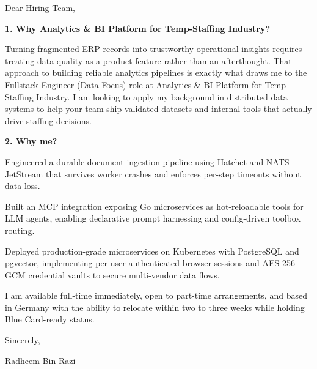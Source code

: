 \documentclass[11pt,a4paper]{coverletter}
\begin{document}

\opening{Dear Hiring Team,}

\vspace{8pt}\noindent\textbf{1. Why Analytics \& BI Platform for Temp-Staffing Industry?}\par\vspace{3pt}

Turning fragmented ERP records into trustworthy operational insights requires treating data quality as a product feature rather than an afterthought. That approach to building reliable analytics pipelines is exactly what draws me to the Fullstack Engineer (Data Focus) role at Analytics \& BI Platform for Temp-Staffing Industry. I am looking to apply my background in distributed data systems to help your team ship validated datasets and internal tools that actually drive staffing decisions.

\vspace{8pt}\noindent\textbf{2. Why me?}\par\vspace{3pt}

\bullets

  \item Engineered a durable document ingestion pipeline using Hatchet and NATS JetStream that survives worker crashes and enforces per-step timeouts without data loss.

  \item Built an MCP integration exposing Go microservices as hot-reloadable tools for LLM agents, enabling declarative prompt harnessing and config-driven toolbox routing.

  \item Deployed production-grade microservices on Kubernetes with PostgreSQL and pgvector, implementing per-user authenticated browser sessions and AES-256-GCM credential vaults to secure multi-vendor data flows.

\bulletsend

I am available full-time immediately, open to part-time arrangements, and based in Germany with the ability to relocate within two to three weeks while holding Blue Card-ready status.

\closing{Sincerely,}{Radheem Bin Razi}

\clearpage
{}

\end{document}

